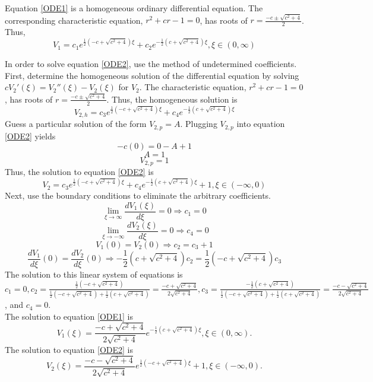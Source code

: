 \documentclass[11pt, oneside]{article}   	%
\begin{document}
Equation \ref{ODE1} is a homogeneous ordinary differential equation. The corresponding characteristic equation, $r^2+cr-1=0$, has roots of  $r=\frac{-c \pm \sqrt{c^2+4}}{2}$. Thus, 
\begin{equation}
\label{ODE1 general solution}
V_{1}=c_1 e^{\frac{1}{2}(-c+\sqrt{c^2+4})\xi}+c_2e^{-\frac{1}{2}(c+\sqrt{c^2+4})\xi}, \xi \in (0,\infty)
\end{equation}

In order to solve equation \ref{ODE2}, use the method of undetermined coefficients. First, determine the homogeneous solution of the differential equation by solving $cV_2'(\xi)=V_2''(\xi)-V_2(\xi)$ for $V_2$. The characteristic equation, $r^2+cr-1=0$, has roots of $r=\frac{-c \pm \sqrt{c^2+4}}{2}$. Thus, the homogeneous solution is
\begin{equation}
\label{homogeneous solution}
V_{2,h}=c_3 e^{\frac{1}{2}(-c+\sqrt{c^2+4})\xi}+c_4 e^{-\frac{1}{2}(c+\sqrt{c^2+4})\xi}
\end{equation}
Guess a particular solution of the form $V_{2,p}=A$. Plugging $V_{2,p}$ into equation \ref{ODE2} yields 
$$-c(0)=0-A+1$$
$$A=1$$ 
$$V_{2,p}=1$$
Thus, the solution to equation \ref{ODE2} is 
\begin{equation}
\label{ODE2 general solution}
V_{2}=c_3 e^{\frac{1}{2}(-c+\sqrt{c^2+4})\xi}+c_4 e^{-\frac{1}{2}(c+\sqrt{c^2+4})\xi}+1, \xi \in (-\infty,0)
\end{equation}
Next, use the boundary conditions to eliminate the arbitrary coefficients. 
$$\lim_{\xi\to\infty} \frac{d V_1(\xi)}{d \xi}=0\Rightarrow c_1=0$$
$$\lim_{\xi\to-\infty} \frac{d V_2(\xi)}{d \xi}=0\Rightarrow c_4=0$$
$$V_1(0)=V_2(0)\Rightarrow c_2=c_3+1$$
$$\frac{d V_1}{d \xi}(0)=\frac{d V_2}{d \xi}(0)\Rightarrow -\frac{1}{2}(c+\sqrt{c^2+4}) c_2= \frac{1}{2}(-c+\sqrt{c^2+4})c_3$$ 
The solution to this linear system of equations is $c_1=0, c_2=\frac{\frac{1}{2}(-c+\sqrt{c^2+4})}{\frac{1}{2}(-c+\sqrt{c^2+4})+\frac{1}{2}(c+\sqrt{c^2+4})}=\frac{-c+\sqrt{c^2+4}}{2\sqrt{c^2+4}}, c_3= \frac{-\frac{1}{2}(c+\sqrt{c^2+4})}{\frac{1}{2}(-c+\sqrt{c^2+4})+\frac{1}{2}(c+\sqrt{c^2+4})}=\frac{-c-\sqrt{c^2+4}}{2\sqrt{c^2+4}}$, and $c_4=0$.\\
The solution to equation \ref{ODE1} is 
\begin{equation}
\label{ODE1 solution}
V_1(\xi)=\frac{-c+\sqrt{c^2+4}}{2\sqrt{c^2+4}}e^{-\frac{1}{2}(c+\sqrt{c^2+4})\xi},\xi \in (0,\infty).
\end{equation}
The solution to equation \ref{ODE2} is
\begin{equation}
\label{ODE2 solution}
V_2(\xi)=\frac{-c-\sqrt{c^2+4}}{2\sqrt{c^2+4}}e^{\frac{1}{2}(-c+\sqrt{c^2+4})\xi}+1,\xi \in (-\infty,0).
\end{equation}
\end{document}
